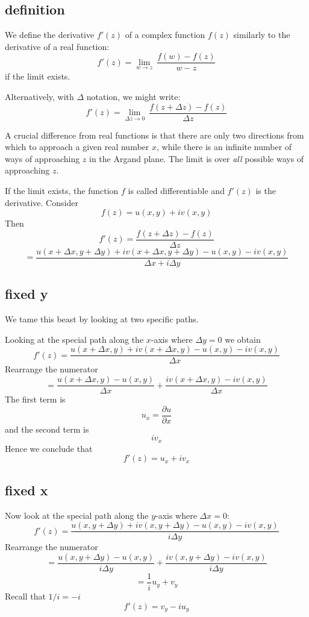 \documentclass[11pt, oneside]{article}
\begin{document}
\subsection*{definition}
We define the derivative $f'(z)$ of a complex function $f(z)$ similarly to the derivative of a real function:
\[ f'(z) = \lim_{w \rightarrow z} \ \frac{f(w) - f(z)}{w-z} \]
if the limit exists.

Alternatively, with $\Delta$ notation, we might write:
\[ f'(z) = \lim_{\Delta z \rightarrow 0} \ \frac{f(z + \Delta z) - f(z)}{\Delta z} \]

A crucial difference from real functions is that there are only two directions from which to approach a given real number $x$, while there is an infinite number of ways of approaching $z$ in the Argand plane.  The limit is over \emph{all} possible ways of approaching $z$.  

If the limit exists, the function $f$ is called differentiable and $f'(z)$ is the derivative.
Consider
\[ f(z) = u(x,y) + i v(x,y) \]
Then
\[ f'(z) = \frac{f(z + \Delta z) - f(z)}{\Delta z} \]
\[ = \frac{u(x + \Delta x, y + \Delta y) + i v (x + \Delta x, y + \Delta y) - u(x,y) - i v(x,y)}{\Delta x + i \Delta y} \]

\subsection*{fixed y}
We tame this beast by looking at two specific paths.

Looking at the special path along the $x$-axis where $\Delta y = 0$ we obtain
\[ f'(z) = \frac{u(x + \Delta x, y) + i v (x + \Delta x, y) - u(x,y) - i v(x,y)}{\Delta x} \]
Rearrange the numerator
\[ = \frac{u(x + \Delta x, y) - u(x,y)}{\Delta x} + \frac{i v (x + \Delta x, y) - i v(x,y)}{\Delta x} \]
The first term is
\[ u_x = \frac{\partial u}{\partial x} \]
and the second term is 
\[ i v_x \]
Hence we conclude that
\[ f'(z) = u_x + i v_x \]

\subsection*{fixed x}
Now look at the special path along the $y$-axis where $\Delta x = 0$:
\[ f'(z) = \frac{u(x, y + \Delta y) + i v (x, y + \Delta y) - u(x,y) - i v(x,y)}{i \Delta y} \]
Rearrange the numerator
\[ = \frac{u(x, y + \Delta y) - u(x,y)}{i \Delta y} + \frac{i v (x, y + \Delta y) - i v(x,y)}{i \Delta y} \]
\[ = \frac{1}{i} u_y + v_y \]
Recall that $1/i = -i$
\[ f'(z) = v_y - i u_y \]
\end{document}

